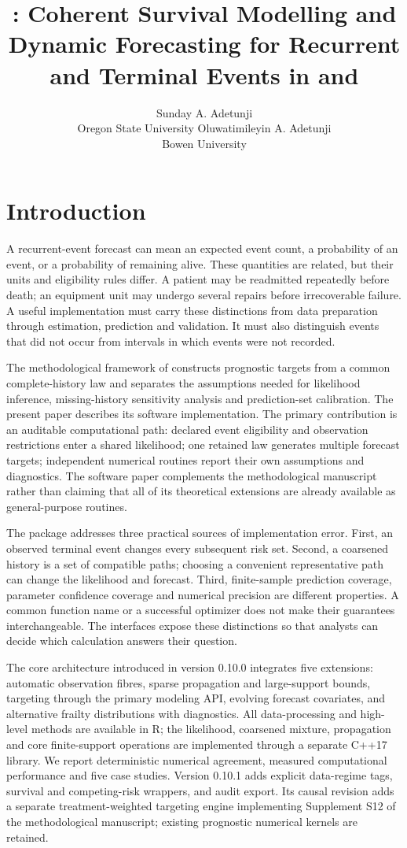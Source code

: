 \documentclass[article,nojss]{jss}
\date{}
\author{Sunday A. Adetunji\\Oregon State University
 \And Oluwatimileyin A. Adetunji\\Bowen University}
\title{\pkg{coherentSurv}: Coherent Survival Modelling and Dynamic Forecasting for Recurrent and Terminal Events in \proglang{R} and \proglang{Python}}
\newcommand{\proglang}[1]{\textsf{#1}}
\begin{document}


\section{Introduction}
\label{sec:intro}
A recurrent-event forecast can mean an expected event count, a probability of an event, or a probability of remaining alive. These quantities are related, but their units and eligibility rules differ. A patient may be readmitted repeatedly before death; an equipment unit may undergo several repairs before irrecoverable failure. A useful implementation must carry these distinctions from data preparation through estimation, prediction and validation. It must also distinguish events that did not occur from intervals in which events were not recorded.

The methodological framework of \citet{Adetunji2026} constructs prognostic targets from a common complete-history law and separates the assumptions needed for likelihood inference, missing-history sensitivity analysis and prediction-set calibration. The present paper describes its software implementation. The primary contribution is an auditable computational path: declared event eligibility and observation restrictions enter a shared likelihood; one retained law generates multiple forecast targets; independent numerical routines report their own assumptions and diagnostics. The software paper complements the methodological manuscript rather than claiming that all of its theoretical extensions are already available as general-purpose routines.

The package addresses three practical sources of implementation error. First, an observed terminal event changes every subsequent risk set. Second, a coarsened history is a set of compatible paths; choosing a convenient representative path can change the likelihood and forecast. Third, finite-sample prediction coverage, parameter confidence coverage and numerical precision are different properties. A common function name or a successful optimizer does not make their guarantees interchangeable. The interfaces expose these distinctions so that analysts can decide which calculation answers their question.

The core architecture introduced in version 0.10.0 integrates five extensions: automatic observation fibres, sparse propagation and large-support bounds, targeting through the primary modeling API, evolving forecast covariates, and alternative frailty distributions with diagnostics. All data-processing and high-level methods are available in \proglang{R}; the likelihood, coarsened mixture, propagation and core finite-support operations are implemented through a separate \proglang{C++17} library. We report deterministic numerical agreement, measured computational performance and five case studies. Version 0.10.1 adds explicit data-regime tags, survival and competing-risk wrappers, and audit export. Its causal revision adds a separate treatment-weighted targeting engine implementing Supplement S12 of the methodological manuscript; existing prognostic numerical kernels are retained.
\end{document}
